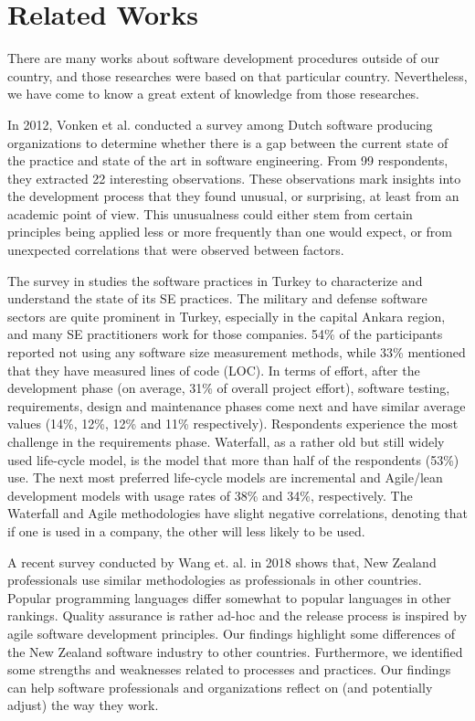 \section{Related Works}

There are many works about software development procedures outside of our country, and those researches were based on that particular country. Nevertheless, we have come to know a great extent of knowledge from those researches.

In 2012, Vonken et al. \citep{Vonken2012} conducted a survey among Dutch software producing organizations to determine whether there is a gap between the current state of the practice and state of the art in software engineering. From 99 respondents, they extracted 22 interesting observations. These observations mark insights into the development process that they found unusual, or surprising, at least from an academic point of view. This unusualness could either stem from certain principles being applied less or more frequently than one would expect, or from unexpected correlations that were observed between factors.

The survey in \citep{Garousi2015} studies the software practices in Turkey to characterize and understand the state of its SE practices. The military and defense software sectors are quite prominent in Turkey, especially in the capital Ankara region, and many SE practitioners work for those companies. 54\% of the participants reported not using any software size measurement methods, while 33\% mentioned that they have measured lines of code (LOC). In terms of effort, after the development phase (on average, 31\% of overall project effort), software testing, requirements, design and maintenance phases come next and have similar average values (14\%, 12\%, 12\% and 11\% respectively). Respondents experience the most challenge in the requirements phase. Waterfall, as a rather old but still widely used life-cycle model, is the model that more than half of the respondents (53\%) use. The next most preferred life-cycle models are incremental and Agile/lean development models with usage rates of 38\% and 34\%, respectively. The Waterfall and Agile methodologies have slight negative correlations, denoting that if one is used in a company, the other will less likely to be used.

A recent survey conducted by Wang et. al. \citep{Wang2018} in 2018 shows that, New Zealand professionals use similar methodologies as professionals in other countries. Popular programming languages differ somewhat to popular languages in other rankings. Quality assurance is rather ad-hoc and the release process is inspired by agile software development principles. Our findings highlight some differences of the New Zealand software industry to other countries. Furthermore, we identified some strengths and weaknesses related to processes and practices. Our findings can help software professionals and organizations reflect on (and potentially adjust) the way they work.

